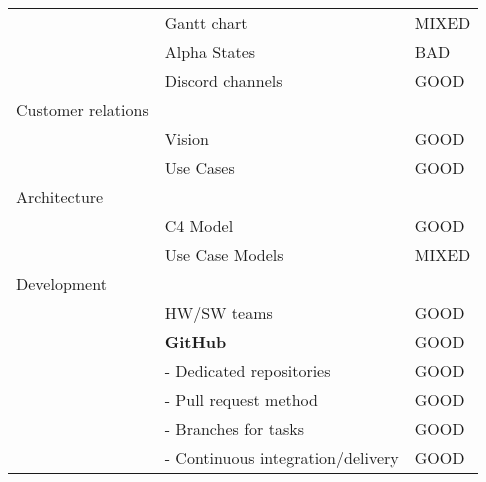 \begin{table}[htbp]
\begin{center}
{\begin{tabular}{lll}
                           & Gantt chart                       & \cellcolor{yellow} MIXED      \\
                           & Alpha States                      & \cellcolor{red} BAD    \\
                           & Discord channels                  & \cellcolor{green} GOOD                                         \\
\rowcolor{grey} Customer relations &                                   &                                            \\
                           & Vision                            & \cellcolor{green} GOOD                                         \\
                           & Use Cases                         & \cellcolor{green} GOOD                                         \\
\rowcolor{grey} Architecture               &                                   &                                              \\
                           & C4 Model                          & \cellcolor{green} GOOD                                         \\
                           & Use Case Models                   & \cellcolor{yellow} MIXED                  \\
\rowcolor{grey} Development                &                                   &                                              \\
                           & HW/SW teams                       & \cellcolor{green} GOOD                                         \\
                           & \textbf{GitHub}                   & \cellcolor{green} GOOD                                         \\
                           & - Dedicated repositories          & \cellcolor{green} GOOD                                         \\
                           & - Pull request method             & \cellcolor{green} GOOD                                         \\
                           & - Branches for tasks              & \cellcolor{green} GOOD                                        \\
                           & - Continuous integration/delivery & \cellcolor{green} GOOD                                         \\

\end{tabular}}
\end{center}
\end{table}
